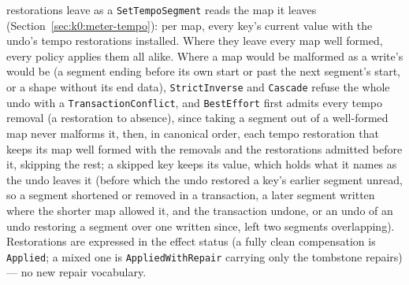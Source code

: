 \documentclass[11pt,letterpaper]{report}
\begin{document}
restorations leave as a \texttt{SetTempoSegment} reads the map it leaves
(Section~\ref{sec:k0:meter-tempo}): per map, every key's current value with
the undo's tempo restorations installed. Where they leave every map well
formed, every policy applies them all alike. Where a map would be malformed
as a write's would be (a segment ending before its own start or past the next
segment's start, or a shape without its end data), \texttt{StrictInverse} and
\texttt{Cascade} refuse the whole undo with a \texttt{TransactionConflict},
and \texttt{BestEffort} first admits every tempo removal (a restoration to
absence), since taking a segment out of a well-formed map never malforms it,
then, in canonical order, each tempo restoration that keeps its map well
formed with the removals and the restorations admitted before it, skipping
the rest; a skipped key keeps its value, which holds what it names as the
undo leaves it (before which the undo restored a key's earlier segment unread, so
a segment shortened or removed in a transaction, a later segment written
where the shorter map allowed it, and the transaction undone, or an undo of
an undo restoring a segment over one written since, left two segments
overlapping). Restorations are expressed in the effect status (a fully
clean compensation is \texttt{Applied}; a mixed one is
\texttt{AppliedWithRepair} carrying only the tombstone repairs) --- no new
repair vocabulary.
\end{document}
